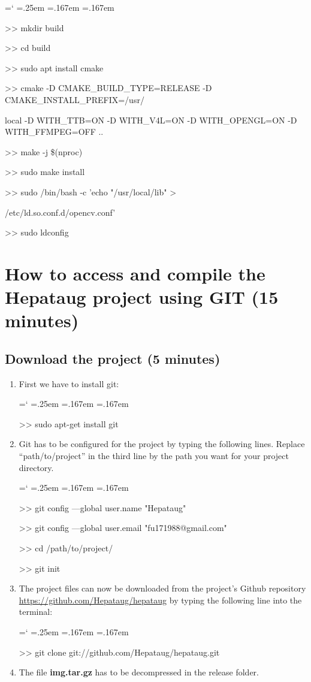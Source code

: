 \documentclass[12pt]{report}
\DeclareRobustCommand*{\ttfamily}{
  \origttfamily
  \hyphenchar\font=`\-\relax
  \fontdimen3\font=.25em\relax
  \fontdimen4\font=.167em\relax
  \fontdimen7\font=.167em\relax
}
\newenvironment{code}{\ttfamily}{}
\begin{document}
\begin{enumerate}
\begin{code}
>> mkdir build

>> cd build

>> sudo apt install cmake

>> cmake -D CMAKE\_BUILD\_TYPE=RELEASE -D CMAKE\_INSTALL\_PREFIX=/usr/

local -D WITH\_TTB=ON -D WITH\_V4L=ON -D WITH\_OPENGL=ON -D WITH\_FFMPEG=OFF ..

>> make -j \$(nproc)

>> sudo make install

>> sudo /bin/bash -c 'echo "/usr/local/lib" >

/etc/ld.so.conf.d/opencv.conf'

>> sudo ldconfig
\end{code}
\end{enumerate}


\chapter{How to access and compile the Hepataug project using GIT (15 minutes)} \label{sec:how to access and compile the Hepataug project} 

\section{Download the project (5 minutes)}
\begin{enumerate}
\item First we have to install git:

\begin{code}
>> sudo apt-get install git
\end{code}


\item Git has to be configured for the project by typing the following lines. Replace ``path/to/project'' in the third line by the path you want for your project directory.

\begin{code}
>> git config ---global user.name "Hepataug"

>> git config ---global user.email "fu171988@gmail.com"

>> cd /path/to/project/

>> git init
\end{code}


\item The project files can now be downloaded from the project's Github repository \url{https://github.com/Hepataug/hepataug} by typing the following line into the terminal:

\begin{code}
>> git clone git://github.com/Hepataug/hepataug.git
\end{code}


\item The file \textbf{img.tar.gz} has to be decompressed in the release folder.
\end{enumerate}
\end{document}
